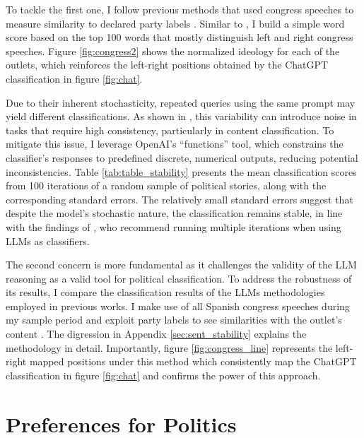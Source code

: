 \documentclass[12pt]{article}
\begin{document}
	To tackle the first one, I follow previous methods that used congress speeches to measure similarity to declared party labels \citep{gentzkow2011competition} \citep{laver2003extracting}. Similar to \cite{laver2003extracting}, I build a simple word score based on the top 100 words that mostly distinguish left and right congress speeches. Figure \ref{fig:congress2} shows the normalized ideology for each of the outlets, which reinforces the left-right positions obtained by the ChatGPT classification in figure \ref{fig:chat}.
	
	
	Due to their inherent stochasticity, repeated queries using the same prompt may yield different classifications. As shown in \citet{llmclassification2024}, this variability can introduce noise in tasks that require high consistency, particularly in content classification. To mitigate this issue, I leverage OpenAI’s ``functions''  tool, which constrains the classifier’s responses to predefined discrete, numerical outputs, reducing potential inconsistencies.  Table \ref{tab:table_stability} presents the mean classification scores from 100 iterations of a random sample of political stories, along with the corresponding standard errors. The relatively small standard errors suggest that despite the model’s stochastic nature, the classification remains stable, in line with the findings of \citet{llmstability2024}, who recommend running multiple iterations when using LLMs as classifiers.
	
	
	The second concern is more fundamental as it challenges the validity of the LLM reasoning as a valid tool for political classification. To address the robustness of its results, I compare the classification results of the LLMs methodologies employed in previous works. I make use of all Spanish congress speeches during my sample period and exploit party labels  to see similarities with the outlet's content \citep{gentzkow2010media}  \citep{laver2003extracting}. The digression in Appendix \ref{sec:sent_stability} explains the methodology in detail. Importantly, figure \ref{fig:congress_line} represents the left-right mapped positions under this method which consistently map the ChatGPT classification in figure \ref{fig:chat} and confirms the power of this approach. 
	
	
	
	\section{Preferences for Politics}\label{section:politics}
	
\end{document}
